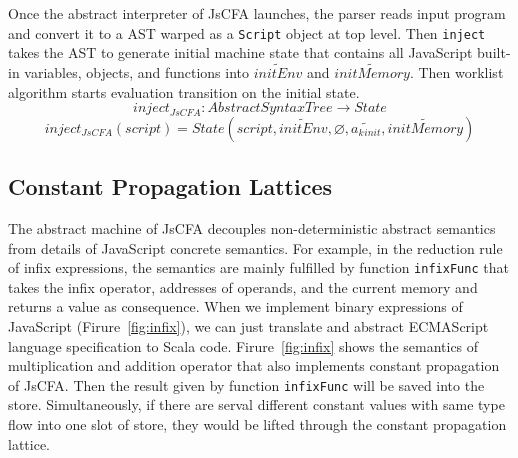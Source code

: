 \documentclass{article}
\begin{document}
Once the abstract interpreter of JsCFA launches, the parser reads input program and convert it to a AST warped as a \verb|Script| object at top level.
Then \verb|inject| takes the AST to generate initial machine state that contains all JavaScript built-in variables, objects, and functions into $\widetilde{initEnv}$ and $\widetilde{initMemory}$. Then worklist algorithm starts evaluation transition on the initial state.
\[
inject_{JsCFA} : AbstractSyntaxTree \to State
\]
\[
inject_{JsCFA}(script) = State(script, \widetilde{initEnv}, \varnothing, \widetilde{a_k{}_{init}}, \widetilde{initMemory})
\]

\iffalse
\subsection{Constant Propagation Lattices}
\label{sub:Constant Propagation Lattices}

The abstract machine of JsCFA decouples non-deterministic abstract semantics from details of JavaScript concrete semantics. For example, in the reduction rule of infix expressions, the semantics are mainly fulfilled by function \verb|infixFunc| that takes the infix operator, addresses of operands, and the current memory and returns a value as consequence. When we implement binary expressions of JavaScript (Firure~\ref{fig:infix}), we can just translate and abstract ECMAScript language specification to Scala code. Firure~\ref{fig:infix} shows the semantics of multiplication and addition operator that also implements constant propagation of JsCFA\@. Then the result given by function \verb|infixFunc| will be saved into the store. Simultaneously, if there are serval different constant values with same type flow into one slot of store, they would be lifted through the constant propagation lattice.


\end{document}
